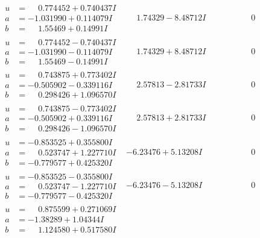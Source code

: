 \documentclass[1p]{elsarticle_modified}
\theoremstyle{definition}
\begin{document}
$$\begin{array}{c|c|c}
\begin{aligned}
u &= \phantom{-}0.774452 + 0.740437 I \\
a &= -1.031990 + 0.114079 I \\
b &= \phantom{-}1.55469 + 0.14991 I\end{aligned}
 & \phantom{-}1.74329 - 8.48712 I & \phantom{-0.000000 } 0 \\ \hline\begin{aligned}
u &= \phantom{-}0.774452 - 0.740437 I \\
a &= -1.031990 - 0.114079 I \\
b &= \phantom{-}1.55469 - 0.14991 I\end{aligned}
 & \phantom{-}1.74329 + 8.48712 I & \phantom{-0.000000 } 0 \\ \hline\begin{aligned}
u &= \phantom{-}0.743875 + 0.773402 I \\
a &= -0.505902 - 0.339116 I \\
b &= \phantom{-}0.298426 + 1.096570 I\end{aligned}
 & \phantom{-}2.57813 - 2.81733 I & \phantom{-0.000000 } 0 \\ \hline\begin{aligned}
u &= \phantom{-}0.743875 - 0.773402 I \\
a &= -0.505902 + 0.339116 I \\
b &= \phantom{-}0.298426 - 1.096570 I\end{aligned}
 & \phantom{-}2.57813 + 2.81733 I & \phantom{-0.000000 } 0 \\ \hline\begin{aligned}
u &= -0.853525 + 0.355800 I \\
a &= \phantom{-}0.523747 + 1.227710 I \\
b &= -0.779577 + 0.425320 I\end{aligned}
 & -6.23476 + 5.13208 I & \phantom{-0.000000 } 0 \\ \hline\begin{aligned}
u &= -0.853525 - 0.355800 I \\
a &= \phantom{-}0.523747 - 1.227710 I \\
b &= -0.779577 - 0.425320 I\end{aligned}
 & -6.23476 - 5.13208 I & \phantom{-0.000000 } 0 \\ \hline\begin{aligned}
u &= \phantom{-}0.875599 + 0.271069 I \\
a &= -1.38289 + 1.04344 I \\
b &= \phantom{-}1.124580 + 0.517580 I\end{aligned}

\end{array}$$
\end{document}
